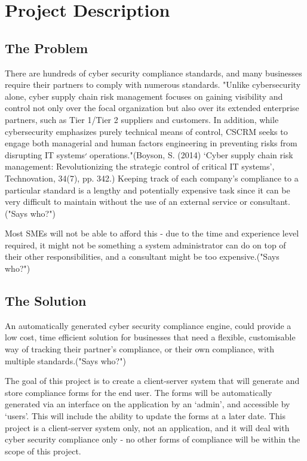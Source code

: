 \chapter{Project Description} \label{Chapter:one}
    \section{The Problem}
        There are hundreds of cyber security compliance standards, and many businesses require their partners to comply with numerous standards. "Unlike cybersecurity alone, cyber supply chain risk management focuses on gaining visibility and control not only over the focal organization but also over its extended enterprise partners, such as Tier 1/Tier 2 suppliers and customers. In addition, while cybersecurity emphasizes purely technical means of control, CSCRM seeks to engage both managerial and human factors engineering in preventing risks from disrupting IT systems׳ operations."(Boyson, S. (2014) ‘Cyber supply chain risk management: Revolutionizing the strategic control of critical IT systems’, Technovation, 34(7), pp. 342.) Keeping track of each company’s compliance to a particular standard is a lengthy and potentially expensive task since it can be very difficult to maintain without the use of an external service or consultant. ("Says who?")

        Most SMEs will not be able to afford this - due to the time and experience level required, it might not be something a system administrator can do on top of their other responsibilities, and a consultant might be too expensive.("Says who?")

    \section{The Solution}
        An automatically generated cyber security compliance engine, could provide a low cost, time efficient solution for businesses that need a flexible, customisable way of tracking their partner’s compliance, or their own compliance, with multiple standards.("Says who?")

        The goal of this project is to create a client-server system that will generate and store compliance forms for the end user. The forms will be automatically generated via an interface on the application by an ‘admin’, and accessible by ‘users’. This will include the ability to update the forms at a later date. This project is a client-server system only, not an application, and it will deal with cyber security compliance only - no other forms of compliance will be within the scope of this project.

